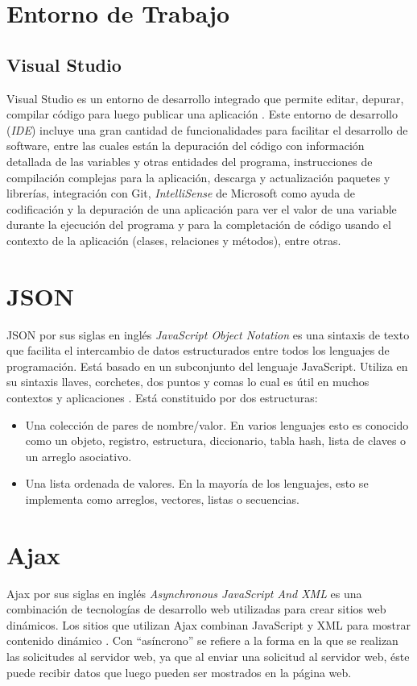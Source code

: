 \section{Entorno de Trabajo}
\subsection{Visual Studio}
Visual Studio es un entorno de desarrollo integrado que permite editar, depurar, compilar código para luego publicar una aplicación \cite{visualStudioMicrosoft}. Este entorno de desarrollo (\textit{IDE}) incluye una gran cantidad de funcionalidades para facilitar el desarrollo de software, entre las cuales están la depuración del código con información detallada de las variables y otras entidades del programa, instrucciones de compilación complejas para la aplicación, descarga y actualización paquetes y librerías, integración con Git, \textit{IntelliSense} de Microsoft como ayuda de codificación y la depuración de una aplicación para ver el valor de una variable durante la ejecución del programa y para la completación de código usando el contexto de la aplicación (clases, relaciones y métodos), entre otras.


\section{JSON}
JSON por sus siglas en inglés \textit{JavaScript Object Notation} es una sintaxis de texto que facilita el intercambio de datos estructurados entre todos los lenguajes de programación. Está basado en un subconjunto del lenguaje JavaScript. Utiliza en su sintaxis llaves, corchetes, dos puntos y comas lo cual es útil en muchos contextos y aplicaciones \cite{json}. Está constituido por dos estructuras:

\begin{itemize}
	\item Una colección de pares de nombre/valor. En varios lenguajes esto es conocido como un objeto, registro, estructura, diccionario, tabla hash, lista de claves o un arreglo asociativo.
    \item Una lista ordenada de valores. En la mayoría de los lenguajes, esto se implementa como arreglos, vectores, listas o secuencias.
\end{itemize}

\section{Ajax}
Ajax por sus siglas en inglés \textit{Asynchronous JavaScript And XML} es una combinación de tecnologías de desarrollo web utilizadas para crear sitios web dinámicos. Los sitios que utilizan Ajax combinan JavaScript y XML para mostrar contenido dinámico \cite{ajaxChristensson}. Con “asíncrono” se refiere a la forma en la que se realizan las solicitudes al servidor web, ya que al enviar una solicitud al servidor web, éste puede recibir datos que luego pueden ser mostrados en la página web.

